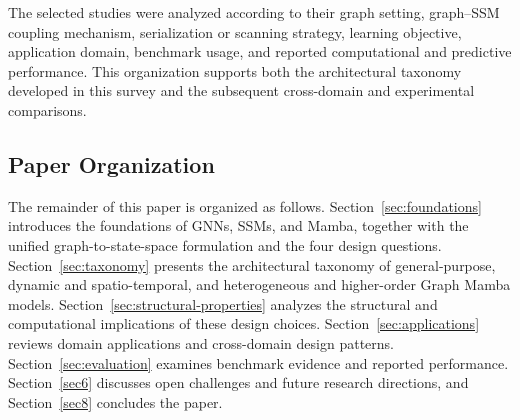 \documentclass[acmsmall]{acmart}
\begin{document}
The selected studies were analyzed according to their graph setting,
graph--SSM coupling mechanism, serialization or scanning strategy, learning
objective, application domain, benchmark usage, and reported computational and
predictive performance. This organization supports both the architectural
taxonomy developed in this survey and the subsequent cross-domain and
experimental comparisons.

\subsection{Paper Organization}

 


The remainder of this paper is organized as follows. Section~\ref{sec:foundations} introduces the foundations of GNNs, SSMs, and Mamba, together with the unified graph-to-state-space formulation and the four design questions. Section~\ref{sec:taxonomy} presents the architectural taxonomy of general-purpose, dynamic and spatio-temporal, and heterogeneous and higher-order Graph Mamba models. Section~\ref{sec:structural-properties} analyzes the structural and computational implications of these design choices. Section~\ref{sec:applications} reviews domain applications and cross-domain design patterns. Section~\ref{sec:evaluation} examines benchmark evidence and reported performance. Section~\ref{sec6} discusses open challenges and future research directions, and Section~\ref{sec8} concludes the paper.
\end{document}
